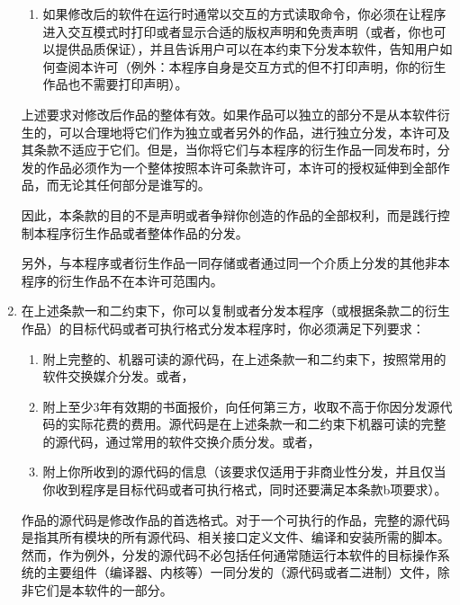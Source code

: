 \documentclass[11pt]{article}
\begin{document}
\begin{enumerate}
\begin{enumerate}
\item
如果修改后的软件在运行时通常以交互的方式读取命令，你必须在让程序进入交互模式时打印或者显示合适的版权声明和免责声明（或者，你也可以提供品质保证），并且告诉用户可以在本约束下分发本软件，告知用户如何查阅本许可（例外：本程序自身是交互方式的但不打印声明，你的衍生作品也不需要打印声明）。

\end{enumerate}


上述要求对修改后作品的整体有效。如果作品可以独立的部分不是从本软件衍生的，可以合理地将它们作为独立或者另外的作品，进行独立分发，本许可及其条款不适应于它们。但是，当你将它们与本程序的衍生作品一同发布时，分发的作品必须作为一个整体按照本许可条款许可，本许可的授权延伸到全部作品，而无论其任何部分是谁写的。


因此，本条款的目的不是声明或者争辩你创造的作品的全部权利，而是践行控制本程序衍生作品或者整体作品的分发。

另外，与本程序或者衍生作品一同存储或者通过同一个介质上分发的其他非本程序的衍生作品不在本许可范围内。

\item
在上述条款一和二约束下，你可以复制或者分发本程序（或根据条款二的衍生作品）的目标代码或者可执行格式分发本程序时，你必须满足下列要求：

\begin{enumerate}

\item

附上完整的、机器可读的源代码，在上述条款一和二约束下，按照常用的软件交换媒介分发。或者，

\item

附上至少3年有效期的书面报价，向任何第三方，收取不高于你因分发源代码的实际花费的费用。源代码是在上述条款一和二约束下机器可读的完整的源代码，通过常用的软件交换介质分发。或者，

\item

附上你所收到的源代码的信息（该要求仅适用于非商业性分发，并且仅当你收到程序是目标代码或者可执行格式，同时还要满足本条款b项要求）。

\end{enumerate}

作品的源代码是修改作品的首选格式。对于一个可执行的作品，完整的源代码是指其所有模块的所有源代码、相关接口定义文件、编译和安装所需的脚本。然而，作为例外，分发的源代码不必包括任何通常随运行本软件的目标操作系统的主要组件（编译器、内核等）一同分发的（源代码或者二进制）文件，除非它们是本软件的一部分。


\end{enumerate}
\end{document}
